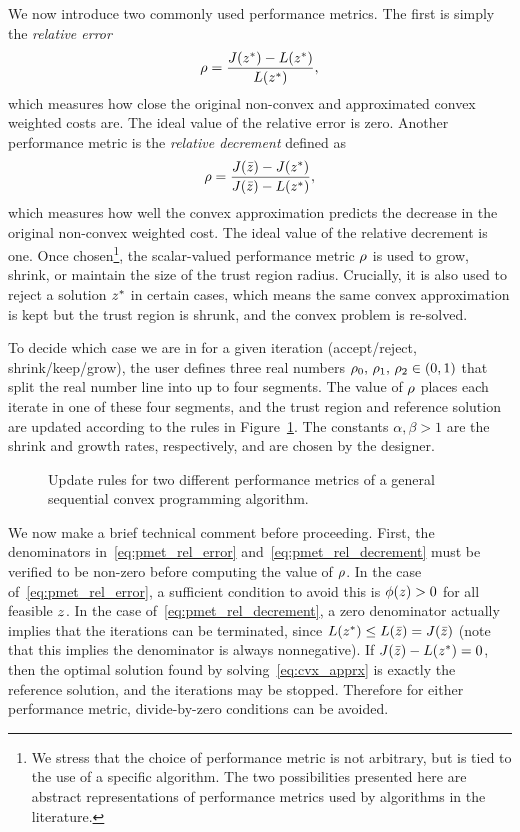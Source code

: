 \documentclass[letterpaper, 10 pt, conference]{ieeeconf}
\begin{document}
We now introduce two commonly used performance metrics. The first is simply the \textit{relative error}
\begin{equation}
\rho = \frac{J(z^*) - L(z^*)}{L(z^*)},
\label{eq:pmet_rel_error}
\end{equation}
which measures how close the original non-convex and approximated convex weighted costs are. The ideal value of the relative error is zero. Another performance metric is the \textit{relative decrement} defined as
\begin{equation}
\rho = \frac{J(\bar{z}) - J(z^*)}{J(\bar{z}) - L(z^*)},
\label{eq:pmet_rel_decrement}
\end{equation}
which measures how well the convex approximation predicts the decrease in the original non-convex weighted cost. The ideal value of the relative decrement is one. Once chosen\footnote{We stress that the choice of performance metric is not arbitrary, but is tied to the use of a specific algorithm. The two possibilities presented here are abstract representations of performance metrics used by algorithms in the literature.}, the scalar-valued performance metric $\rho$ is used to grow, shrink, or maintain the size of the trust region radius. Crucially, it is also used to reject a solution $z^*$ in certain cases, which means the same convex approximation is kept but the trust region is shrunk, and the convex problem is re-solved. 

To decide which case we are in for a given iteration (accept/reject, shrink/keep/grow), the user defines three real numbers $\rho_0,\,\rho_1,\,\rho_2\in(0,1)$ that split the real number line into up to four segments. The value of $\rho$ places each iterate in one of these four segments, and the trust region and reference solution are updated according to the rules in Figure~\ref{fig:scp_updates}. The constants $\alpha,\beta >1$ are the shrink and growth rates, respectively, and are chosen by the designer. 

\begin{figure}
\centering

\caption{Update rules for two different performance metrics of a general sequential convex programming algorithm.}
\label{fig:scp_updates}
\end{figure}

We now make a brief technical comment before proceeding. First, the denominators in~\eqref{eq:pmet_rel_error} and~\eqref{eq:pmet_rel_decrement} must be verified to be non-zero before computing the value of $\rho$. In the case of~\eqref{eq:pmet_rel_error}, a sufficient condition to avoid this is $\phi(z)>0$ for all feasible $z$. In the case of~\eqref{eq:pmet_rel_decrement}, a zero denominator actually implies that the iterations can be terminated, since $L(z^*) \leq L(\bar{z}) = J(\bar{z})$ (note that this implies the denominator is always nonnegative). If $J(\bar{z})-L(z^*)=0$, then the optimal solution found by solving~\eqref{eq:cvx_apprx} is exactly the reference solution, and the iterations may be stopped. Therefore for either performance metric, divide-by-zero conditions can be avoided.   
\end{document}
